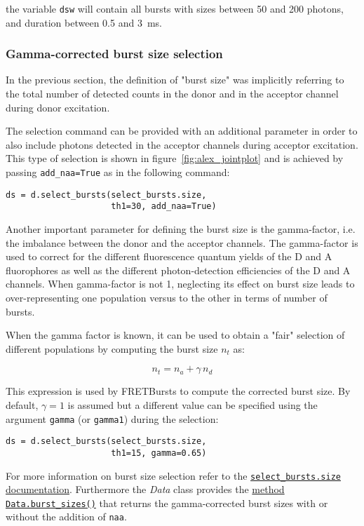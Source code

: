 the variable \verb|dsw| will contain all bursts with sizes between 50 and
200 photons, and duration between 0.5 and 3~ms.

\subsubsection{Gamma-corrected burst size selection}

In the previous section, the definition of "burst size" was implicitly referring
to the total number of detected counts in the donor and in the acceptor channel
during donor excitation.

The selection command can be provided with an additional parameter in order to
also include photons detected in the acceptor channels during acceptor excitation.
This type of selection is shown in figure~\ref{fig:alex_jointplot} and is achieved 
by passing \verb|add_naa=True| as in the following command:

\begin{verbatim}
ds = d.select_bursts(select_bursts.size,
                     th1=30, add_naa=True)
\end{verbatim}

Another important parameter for defining the burst size is the gamma-factor, i.e.
the imbalance between the donor and the acceptor channels. The gamma-factor is
used to correct for the different fluorescence quantum yields of the D and A
fluorophores as well as the different photon-detection efficiencies of the D and A channels.
When gamma-factor is not 1, neglecting its effect on burst size leads to
over-representing one population versus to the other in terms of number of bursts.

When the gamma factor is known, it can be used to obtain a "fair" selection
of different populations by computing the burst size $n_t$ as:

$$ n_t = n_a + \gamma\,n_d$$ 

This expression is used by FRETBursts to compute the corrected burst size.
By default, $\gamma=1$ is assumed but a different value can be specified
using the argument \verb|gamma| (or \verb|gamma1|) during the selection:

\begin{verbatim}
ds = d.select_bursts(select_bursts.size,
                     th1=15, gamma=0.65)
\end{verbatim}

For more information on burst size selection refer to the
\href{http://fretbursts.readthedocs.org/en/latest/burst_selection.html#fretbursts.select\_bursts.size}{\texttt{select\_bursts.size} documentation}. Furthermore the \textit{Data} class provides the
\href{http://fretbursts.readthedocs.org/en/latest/data_class.html#fretbursts.burstlib.Data.burst_sizes}{method \texttt{Data.burst\_sizes()}} that returns the gamma-corrected burst sizes with or
without the addition of \verb|naa|.

